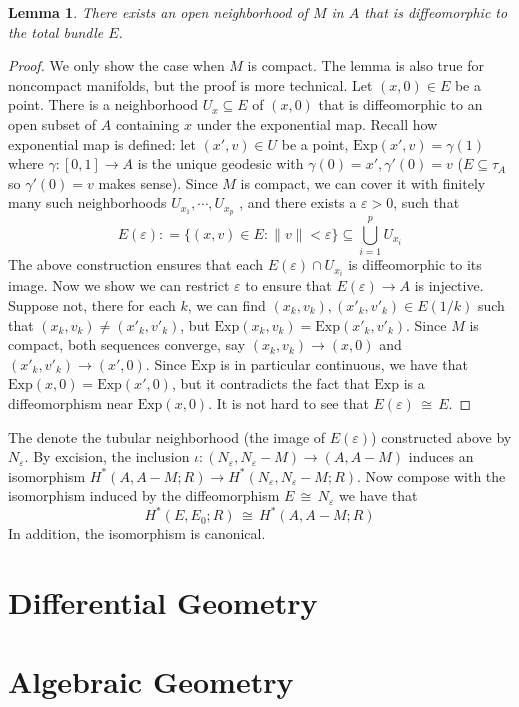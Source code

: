 \documentclass[12pt]{article}
\theoremstyle{plain}
\newtheorem{lemma}[equation]{Lemma}
\theoremstyle{definition}
\newcommand\iso{\,{\cong}\,}
\newcommand\union{\bigcup}
\newcommand{\<}{\langle}
\renewcommand{\>}{\rangle}
\newcommand{\Exp}{\mathrm{Exp}}
\newcommand{\sm}{\varepsilon}
\begin{document}
\begin{lemma}
There exists an open neighborhood of $M$ in $A$ that is diffeomorphic to the total bundle $E$. 
\end{lemma}
\begin{proof}
We only show the case when $M$ is compact. The lemma is also true for noncompact manifolds, but the proof is more technical. Let $(x, 0) \in E$ be a point. There is a neighborhood $U_x \subseteq E$ of $(x, 0)$ that is diffeomorphic to an open subset of $A$ containing $x$ under the exponential map. Recall how exponential map is defined: let $(x', v) \in U$ be a point, $\Exp(x', v) = \gamma(1)$ where $\gamma : [0, 1] \to A$ is the unique geodesic with $\gamma(0) = x', \gamma'(0) = v$ ($E \subseteq \tau_A$ so $\gamma'(0) = v$ makes sense). Since $M$ is compact, we can cover it with finitely many such neighborhoods $U_{x_1}, \cdots, U_{x_p}$ , and there exists a $\sm >0 $, such that 
$$ E(\sm) : = \{(x, v) \in E : \| v\| < \sm \} \subseteq \union_{i = 1}^p U_{x_i}$$ 
The above construction ensures that each $E(\sm) \cap U_{x_i}$ is diffeomorphic to its image. Now we show we can restrict $\sm$ to ensure that $E(\sm) \to A$ is injective. Suppose not, there for each $k$, we can find $(x_k, v_k), (x'_k, v'_k) \in E(1/k)$ such that $(x_k, v_k) \neq (x'_k, v'_k)$, but $\Exp(x_k, v_k) = \Exp(x'_k, v'_k)$. Since $M$ is compact, both sequences converge, say $(x_k, v_k) \to (x, 0)$ and $(x'_k, v'_k) \to (x', 0)$. Since $\Exp$ is in particular continuous, we have that $\Exp(x, 0) = \Exp(x', 0)$, but it contradicts the fact that $\Exp$ is a diffeomorphism near $\Exp(x, 0)$. It is not hard to see that $E(\sm) \iso E$. 
\end{proof}
The denote the tubular neighborhood (the image of $E(\sm)$) constructed above by $N_\sm$. By excision, the inclusion $\iota : (N_\sm, N_\sm - M) \to (A, A - M)$ induces an isomorphism $H^*(A, A - M; R) \to H^*(N_\sm, N_\sm - M; R)$. Now compose with the isomorphism induced by the diffeomorphism $E \iso N_\sm$ we have that 
$$ H^*(E, E_0; R) \iso H^*(A, A - M; R) $$
In addition, the isomorphism is canonical. 


\section{Differential Geometry}

\section{Algebraic Geometry}
\end{document}
